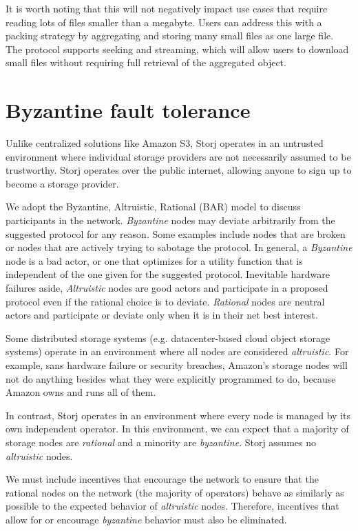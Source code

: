 \documentclass[8pt,fleqn,openany]{book}
\begin{document}
It is worth noting that this will not negatively impact use cases that
require reading lots of files smaller than a megabyte. Users can address this
with a packing strategy by aggregating and storing many small files as one
large file.
The protocol supports seeking and streaming, which will allow users to download small files
without requiring full retrieval of the aggregated object.

\section{Byzantine fault tolerance}

Unlike centralized solutions like Amazon S3, Storj operates in an untrusted
environment where individual storage providers are not necessarily assumed to be
trustworthy. Storj operates over the public internet, allowing anyone to sign
up to become a storage provider.

We adopt the Byzantine, Altruistic, Rational (BAR) model \cite{bar} to discuss
participants in the network.
{\em Byzantine} nodes may deviate arbitrarily from the suggested protocol for
any reason. Some examples include nodes that are broken or nodes that
are actively trying to sabotage the protocol. In general, a {\em Byzantine} node is a bad actor, or 
one that optimizes for a utility function that is independent of the one
given for the suggested protocol.
Inevitable hardware failures aside, {\em Altruistic} nodes are good actors and
participate in a proposed protocol even if the rational choice is to deviate.
{\em Rational} nodes are neutral actors and participate or deviate only when it
is in their net best interest.

Some distributed storage systems (e.g. datacenter-based cloud object storage systems)
operate in an environment
where all nodes are considered {\em altruistic}. For example, sans hardware failure
or security breaches, Amazon's storage nodes
will not do anything besides what they were explicitly programmed to do,
because Amazon owns and runs all of them.

In contrast, Storj operates in an environment where every node is
managed by its own independent operator.
In this environment, we can expect that a majority
of storage nodes are {\em rational} and a minority are {\em byzantine}. Storj assumes no
{\em altruistic} nodes.

We must include incentives that encourage the network to ensure that the rational nodes on the network (the majority of operators) behave as similarly as possible to the expected behavior of {\em altruistic} nodes. Therefore, incentives that allow for or encourage {\em byzantine} behavior must also be eliminated.
\end{document}
